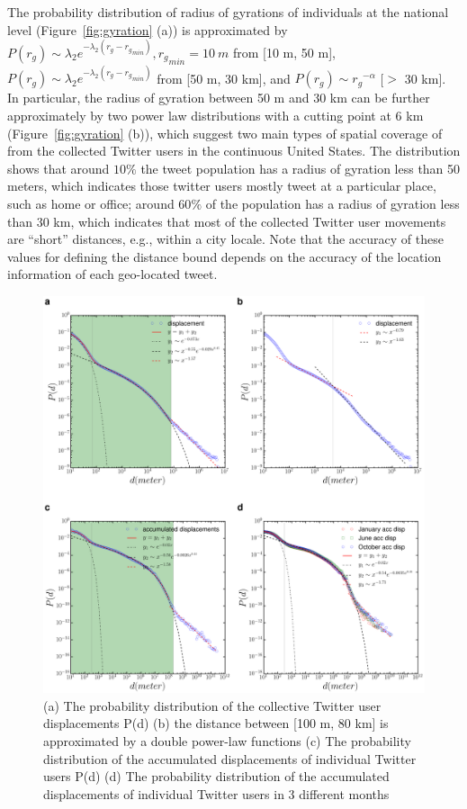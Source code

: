 \documentclass[ijgi,article,submit,moreauthors,pdftex,10pt,a4paper]{mdpi}
\theoremstyle{mdpi}
\newcounter{re}
\theoremstyle{mdpidefinition}
\begin{document}
The probability distribution of radius of gyrations of individuals at the national level (Figure~\ref{fig:gyration} (a)) is approximated by $P(r_{g}) \sim \lambda_{2} e^{-\lambda_{2}(r_{g} - {r_{g}}_{min})}, {r_{g}}_{min}=10~m$ from [10 m, 50 m], $P(r_{g}) \sim \lambda_{2} e^{-\lambda_{2}(r_{g} - {r_{g}}_{min})}$ from [50 m, 30 km], and $P(r_{g}) \sim {r_{g}}^{-\alpha}$ [$>$ 30 km].
In particular, the radius of gyration between 50 m and 30 km can be further approximately by two power law distributions with a cutting point at 6 km (Figure~\ref{fig:gyration} (b)), which suggest two main types of spatial coverage of from the collected Twitter users in the continuous United States.
The distribution shows that around $10\%$ the tweet population has a radius of gyration less than 50 meters, which indicates those twitter users mostly tweet at a particular place, such as home or office;  around 60$\%$ of the population has a radius of gyration less than 30 km, which indicates that most of the collected Twitter user movements are ``short'' distances, e.g., within a city locale. Note that the accuracy of these values for defining the distance bound depends on the accuracy of the location information of each geo-located tweet.

\begin{figure}[ht]
\centering
\includegraphics[width=1.0\linewidth]{./figures/displacement}
\caption{(a) The probability distribution of the collective Twitter user displacements P(d) (b) the distance between [100 m, 80 km] is approximated by a double power-law functions (c) The probability distribution of the accumulated displacements of individual Twitter users P(d) (d) The probability distribution of the accumulated displacements of individual Twitter users in 3 different months}
\label{fig:displacement}
\end{figure}
\FloatBarrier
\end{document}
